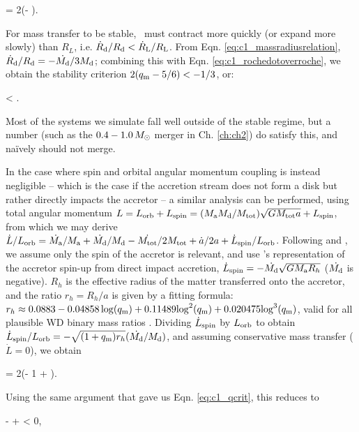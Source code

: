\eqbegin
{} = 2(\qm- )\frac{\dot{\Md}}{\Md}.
\label{eq:c1_rochedotoverroche}
\eqend

\noindent For mass transfer to be stable, \Rd\ must contract more quickly (or expand more slowly) than $R_L$, i.e. $\dot{R}_\mrm{d}/\Rd < \dot{R}_\mrm{L}/R_\mrm{L}$.  From Eqn. \ref{eq:c1_massradiusrelation}, $\dot{R}_\mrm{d}/\Rd = -\dot{\Md}/3\Md$; combining this with Eqn. \ref{eq:c1_rochedotoverroche}, we obtain the stability criterion $2(\qm- 5/6) < -1/3$, or:

\eqbegin
\qm < .
\label{eq:c1_qcrit}
\eqend

\noindent Most of the systems we simulate fall well outside of the stable regime, but a number (such as the $0.4 - 1.0\,\Msun$ merger in Ch. \ref{ch:ch2}) do satisfy this, and na\"{i}vely should not merge.

In the case where spin and orbital angular momentum coupling is instead negligible -- which is the case if the accretion stream does not form a disk but rather directly impacts the accretor \citep{nele+01} -- a similar analysis can be performed, using total angular momentum $L = L_\mrm{orb} + L_\mrm{spin} = (\Ma\Md/\Mtot)\sqrt{G\Mtot a} + L_\mrm{spin}$, from which we may derive $\dot{L}/L_\mrm{orb} = \dot{\Ma}/\Ma + \dot{\Md}/\Md - \dot{\Mtot}/2\Mtot + \dot{a}/2a + \dot{L}_\mrm{spin}/L_\mrm{orb}$.  Following \cite{marsns04} and \cite{nele+01}, we assume only the spin of the accretor is relevant, and use \cite{verbr88}'s representation of the accretor spin-up from direct impact accretion, $\dot{L}_\mrm{spin} = -\dot{\Md}\sqrt{G\Ma R_h}$ ($\dot{\Md}$ is negative).  $R_h$ is the effective radius of the matter transferred onto the accretor, and the ratio $r_h = R_h/a$ is given by a fitting formula: $r_h \approx 0.0883 - 0.04858\log(\qm) + 0.11489{\log}^2(\qm) + 0.020475{\log}^3(\qm)$, valid for all plausible WD binary mass ratios \citep{verbr88}.  Dividing $\dot{L}_\mathrm{spin}$ by $L_\mathrm{orb}$ to obtain $\dot{L}_\mrm{spin}/L_\mrm{orb} = -\sqrt{(1 + \qm)r_h}(\dot{\Md}/\Md)$, and assuming conservative mass transfer ($\dot{L} = 0$), we obtain

\eqbegin
{} = 2\left(\qm- 1 + \right)\frac{\dot{\Md}}{\Md}.
\label{eq:c1_adotovera2}
\eqend

\noindent Using the same argument that gave us Eqn. \ref{eq:c1_qcrit}, this reduces to

\eqbegin
\qm-  +  < 0,
\label{eq:c1_qcrit2}
\eqend

